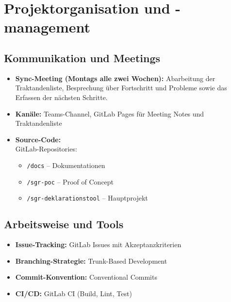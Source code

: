 \documentclass[a4paper,12pt]{article}
\begin{document}
\newpage
\section{Projektorganisation und -management}

\subsection{Kommunikation und Meetings}
\begin{itemize}
  \item \textbf{Sync-Meeting (Montags alle zwei Wochen):} Abarbeitung der Traktandenliste, Besprechung über Fortschritt und Probleme sowie das Erfassen der nächsten Schritte.

  \item \textbf{Kanäle:} Teams-Channel, GitLab Pages für Meeting Notes und Traktandenliste
  
  \item \textbf{Source-Code:} \\
    GitLab-Repositories:  
    \begin{itemize}
      \item \texttt{/docs} – Dokumentationen  
      \item \texttt{/sgr-poc} – Proof of Concept  
      \item \texttt{/sgr-deklarationstool} – Hauptprojekt  
    \end{itemize}
\end{itemize}

\subsection{Arbeitsweise und Tools}
\begin{itemize}
  \item \textbf{Issue-Tracking:} GitLab Issues mit Akzeptanzkriterien
  
  \item \textbf{Branching-Strategie:} Trunk-Based Development
  
  \item \textbf{Commit-Konvention:} Conventional Commits
  
  \item \textbf{CI/CD:} GitLab CI (Build, Lint, Test)

\end{itemize}

\newpage
\end{document}
